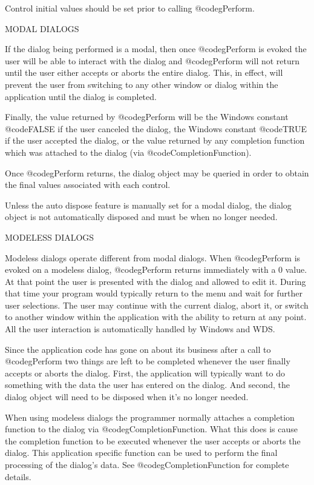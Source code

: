 Control initial values should be set prior to calling @code{gPerform}.

MODAL DIALOGS

If the dialog being performed is a modal, then once @code{gPerform} is
evoked the user will be able to interact with the dialog and @code{gPerform}
will not return until the user either accepts or aborts the entire dialog.
This, in effect, will prevent the user from switching to any other window
or dialog within the application until the dialog is completed.

Finally, the value returned by @code{gPerform} will be the Windows
constant @code{FALSE} if the user canceled the dialog, the Windows
constant @code{TRUE} if the user accepted the dialog, or the
value returned by any completion function which was attached to the
dialog (via @code{CompletionFunction}).

Once @code{gPerform} returns, the dialog object may be queried in
order to obtain the final values associated with each control.

Unless the auto dispose feature is manually set for a modal dialog,
the dialog object is not automatically disposed and must be when
no longer needed.

MODELESS DIALOGS

Modeless dialogs operate different from modal dialogs.  When
@code{gPerform} is evoked on a modeless dialog, @code{gPerform} returns
immediately with a 0 value.  At that point the user is presented with the
dialog and allowed to edit it.  During that time your program would typically
return to the menu and wait for further user selections.  The user may
continue with the current dialog, abort it, or switch to another window
within the application with the ability to return at any point.  All the
user interaction is automatically handled by Windows and WDS.

Since the application code has gone on about its business after a call
to @code{gPerform} two things are left to be completed whenever the user
finally accepts or aborts the dialog.  First, the application will
typically want to do something with the data the user has entered on the
dialog.  And second, the dialog object will need to be disposed when
it's no longer needed.

When using modeless dialogs the programmer normally attaches a completion
function to the dialog via @code{gCompletionFunction}.  What this does
is cause the completion function to be executed whenever the user
accepts or aborts the dialog.  This application specific function can be
used to perform the final processing of the dialog's data.  See
@code{gCompletionFunction} for complete details.

